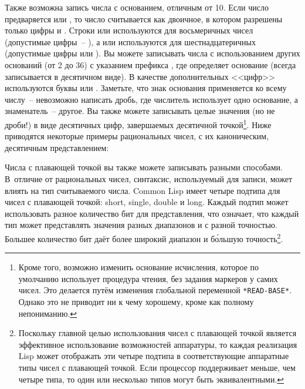 Также возможна запись числа с основанием, отличным от 10.  Если число предваряется
 или , то число считывается как двоичное, в котором разрешены только
цифры  и .  Строки  или  используются для восьмеричных
чисел (допустимые цифры~-- ), а  или  используются для
шестнадцатеричных (допустимые цифры  или ).  Вы можете записывать
числа с использованием других оснований (от 2 до 36) с указанием префикса , где
 определяет основание (всегда записывается в десятичном виде).  В качестве
дополнительных <<цифр>> используются буквы  или .  Заметьте, что знак
основания применяется ко всему числу~-- невозможно написать дробь, где числитель
использует одно основание, а знаменатель~-- другое.  Вы также можете записывать целые
значения (но не дроби!) в виде десятичных цифр, завершаемых десятичной
точкой\footnote{Кроме того, возможно изменить основание исчисления, которое по умолчанию
  использует процедура чтения, без задания маркеров у самих чисел. Это делается путём
  изменения глобальной переменной \lstinline{*READ-BASE*}.  Однако это не приводит ни к чему
  хорошему, кроме как полному непониманию.}.  Ниже приводятся некоторые примеры
рациональных чисел, с их каноническим, десятичным представлением:


Числа с плавающей точкой вы также можете записывать разными способами.  В~отличие от
рациональных чисел, синтаксис, используемый для записи, может влиять на тип считываемого
числа.  Common Lisp имеет четыре подтипа для чисел с плавающей точкой: short, single,
double и long.  Каждый подтип может использовать разное количество бит для представления,
что означает, что каждый тип может представлять значения разных диапазонов и с разной
точностью.  Большее количество бит даёт более широкий диапазон и б\'{о}льшую
точность\footnote{Поскольку главной целью использования чисел с плавающей точкой является
  эффективное использование возможностей аппаратуры, то каждая реализация Lisp может
  отображать эти четыре подтипа в соответствующие аппаратные типы чисел с плавающей
  точкой.  Если процессор поддерживает меньше, чем четыре типа, то один или несколько
  типов могут быть эквивалентными.}.

